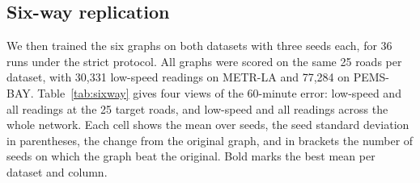 \documentclass[journal]{IEEEtran}
\begin{document}
\subsection{Six-way replication}
We then trained the six graphs on both datasets with three seeds each, for 36 runs under the strict protocol. All graphs were scored on the same 25 roads per dataset, with 30{,}331 low-speed readings on METR-LA and 77{,}284 on PEMS-BAY. Table~\ref{tab:sixway} gives four views of the 60-minute error: low-speed and all readings at the 25 target roads, and low-speed and all readings across the whole network. Each cell shows the mean over seeds, the seed standard deviation in parentheses, the change from the original graph, and in brackets the number of seeds on which the graph beat the original. Bold marks the best mean per dataset and column.
\end{document}
